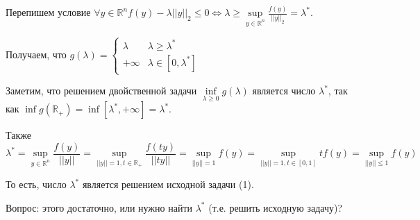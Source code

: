 \documentclass[a4paper]{article}
\begin{document}
Перепишем условие $\forall y\in\mathbb{R}^n f(y)-\lambda ||y||_2\leqslant 0\Leftrightarrow \lambda\geqslant \sup\limits_{y\in\mathbb{R}^n}\frac{f(y)}{||y||_2}=\lambda^*$.

Получаем, что $g(\lambda)=\begin{cases}
\lambda & \lambda\geqslant \lambda^*\\
+\infty & \lambda\in[0,\lambda^*]
\end{cases}$

Заметим, что решением двойственной задачи $\inf\limits_{\lambda\geqslant 0}g(\lambda)$ является число $\lambda^*$, так как $\inf g(\mathbb{R}_+)=\inf[\lambda^*,+\infty]=\lambda^*$.

Также
 $$\lambda^*=\sup\limits_{y\in\mathbb{R}^n}\frac{f(y)}{||y||}=\sup\limits_{||y||=1, t\in\mathbb{R}_+}\frac{f(ty)}{||ty||}=\sup\limits_{||y||=1}f(y)=\sup\limits_{||y||=1,t\in[0,1]}tf(y)=\sup\limits_{||y||\leqslant 1}f(y)$$

То есть, число $\lambda^*$ является решением исходной задачи (1).

Вопрос: этого достаточно, или нужно найти $\lambda^*$ (т.е. решить исходную задачу)?
\end{document}
